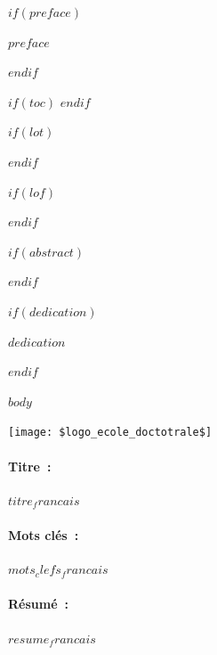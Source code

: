 \documentclass[12pt,a4paper]{reedthesis}
\begin{document}
$if(preface)$
  \begin{preface}
    $preface$
  \end{preface}
$endif$

$if(toc)$
  \hypersetup{linkcolor=$if(toccolor)$$toccolor$$else$black$endif$}
  \setcounter{secnumdepth}{$toc-depth$}
  \setcounter{tocdepth}{$toc-depth$}
  \tableofcontents
$endif$

$if(lot)$
  \listoftables
$endif$

$if(lof)$
  \listoffigures
$endif$

$if(abstract)$
  \begin{abstract}
    $abstract$
  \end{abstract}
$endif$

$if(dedication)$
  \begin{dedication}
    $dedication$
  \end{dedication}
$endif$

\mainmatter %
\pagestyle{fancyplain} %

$body$


\ifthispageodd{}{\newpage\thispagestyle{empty}\null}
\newpage
\thispagestyle{empty}
\selectfont

\lhead{}
\rhead{}
\rfoot{}
\cfoot{}
\lfoot{}

\noindent
\texttt{[image: \$logo\_ecole\_doctotrale\$]}
\vspace{1cm}

\begin{mdframed}[linecolor=Prune,linewidth=1]
\vspace{-.25cm}
\paragraph*{Titre~:} $titre_francais$
\begin{small}
\vspace{-.25cm}
\paragraph*{Mots clés~:} $mots_clefs_francais$

\vspace{-.5cm}
\begin{multicols}{2}
\paragraph*{Résumé~:} $resume_francais$
\end{multicols}
\end{small}
\end{mdframed}
\end{document}
